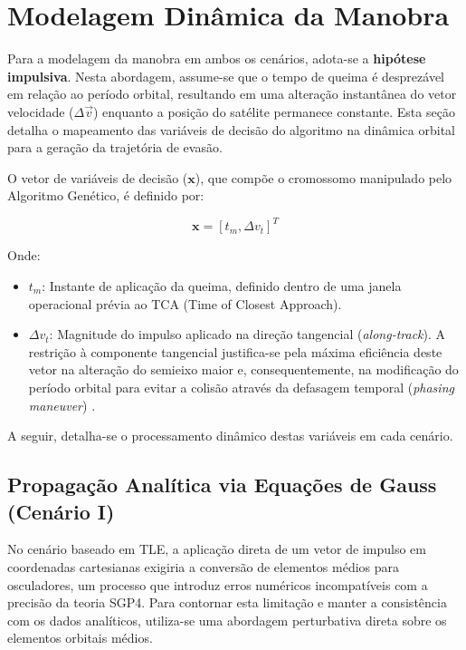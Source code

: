 \section{Modelagem Dinâmica da Manobra}
\label{sec:maneuver_modeling}

Para a modelagem da manobra em ambos os cenários, adota-se a \textbf{hipótese impulsiva}. Nesta abordagem, assume-se que o tempo de queima é desprezável em relação ao período orbital, resultando em uma alteração instantânea do vetor velocidade ($\Delta \vec{v}$) enquanto a posição do satélite permanece constante. Esta seção detalha o mapeamento das variáveis de decisão do algoritmo na dinâmica orbital para a geração da trajetória de evasão.

O vetor de variáveis de decisão ($\mathbf{x}$), que compõe o cromossomo manipulado pelo Algoritmo Genético, é definido por:

\begin{equation}
    \mathbf{x} = [t_m, \Delta v_{t}]^T
\end{equation}

Onde:
\begin{itemize}
    \item $t_m$: Instante de aplicação da queima, definido dentro de uma janela operacional prévia ao TCA (Time of Closest Approach).
    \item $\Delta v_{t}$: Magnitude do impulso aplicado na direção tangencial (\textit{along-track}). A restrição à componente tangencial justifica-se pela máxima eficiência deste vetor na alteração do semieixo maior e, consequentemente, na modificação do período orbital para evitar a colisão através da defasagem temporal (\textit{phasing maneuver}) \cite{Vallado2013}.
\end{itemize}

A seguir, detalha-se o processamento dinâmico destas variáveis em cada cenário.

\subsection{Propagação Analítica via Equações de Gauss (Cenário I)}
\label{subsec:gauss_modeling}

No cenário baseado em TLE, a aplicação direta de um vetor de impulso em coordenadas cartesianas exigiria a conversão de elementos médios para osculadores, um processo que introduz erros numéricos incompatíveis com a precisão da teoria SGP4. Para contornar esta limitação e manter a consistência com os dados analíticos, utiliza-se uma abordagem perturbativa direta sobre os elementos orbitais médios.

